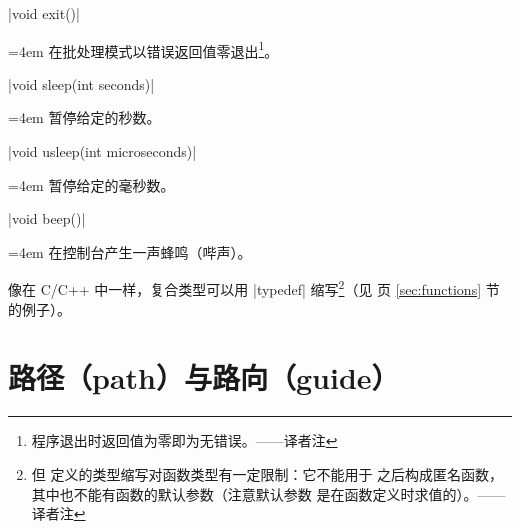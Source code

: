 \documentclass{ctexbook}
\makeatletter
\newenvironment{funclist}{\trivlist
  \parindent=0pt
\item[]
  \def\item{\medskip\par\leftskip=0pt}
  \def\go{\par\leftskip=4em}}
{\endtrivlist}
\newenvironment{typelist}{\itemize
  \let\old@item\@item
  \def\@item[##1]{\expandafter\old@item[\ttfamily\color{type!50!black}##1]}}
{\enditemize}
\newcommand\transnote[1]{\footnote{#1——译者注}}
\makeatother
\begin{document}
\begin{typelist}
\begin{funclist}
\item |void exit()| \go
  在批处理模式以错误返回值零退出\transnote{程序退出时返回值为零即为无错误。}。

\item |void sleep(int seconds)| \go
  暂停给定的秒数。

\item |void usleep(int microseconds)| \go
  暂停给定的毫秒数。

\item |void beep()| \go
  在控制台产生一声蜂鸣（哔声）。
\end{funclist}
\end{typelist}

像在 C/C++ 中一样，复合类型可以用 |typedef| 缩写\transnote{但
 定义的类型缩写对函数类型有一定限制：它不能用于
\inlinecode{new} 之后构成匿名函数，其中也不能有函数的默认参数（注意默认参数
是在函数定义时求值的）。}（见 \pageref{sec:functions} 页 \ref{sec:functions}
节的例子）。



\section{路径（path）与路向（guide）}
\label{sec:pathsandguides}
\end{document}

